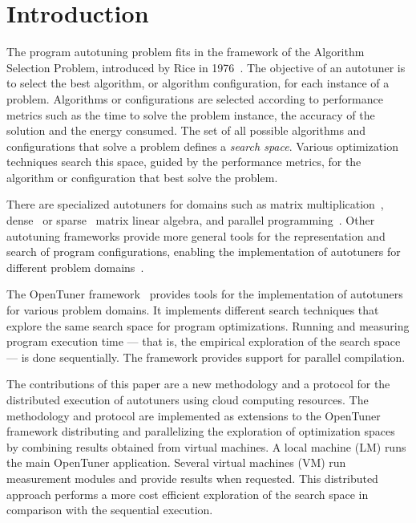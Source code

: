 \section{Introduction} \label{sec:intro}

The program autotuning problem fits in the framework of the Algorithm Selection
Problem, introduced by Rice in 1976~\cite{rice1976algorithm}. The objective of
an autotuner is to select the best algorithm, or algorithm configuration, for
each instance of a problem.  Algorithms or configurations are selected
according to performance metrics such as the time to solve the problem
instance, the accuracy of the solution and the energy consumed.  The set of all
possible algorithms and configurations that solve a problem defines a
\emph{search space}. Various optimization techniques search this space, guided
by the performance metrics, for the algorithm or configuration that best solve
the problem.

There are specialized autotuners for domains such as matrix
multiplication~\cite{bilmes1997phipac}, dense~\cite{whaley1998atlas} or
sparse~\cite{vuduc2005oski} matrix linear algebra, and parallel
programming~\cite{jordan2012multi}. Other autotuning frameworks provide more
general tools for the representation and search of program configurations,
enabling the implementation of autotuners for different problem
domains~\cite{ansel2014opentuner,hutter2009paramils}.

The OpenTuner framework~\cite{ansel2014opentuner} provides tools for the
implementation of autotuners for various problem domains. It implements
different search techniques that explore the same search space for program
optimizations. 
Running and measuring program execution time --- that is, the empirical 
exploration of the search space --- is done sequentially.
The framework provides support for parallel compilation.

The contributions of this paper are a new methodology and a protocol for the
distributed execution of autotuners using cloud computing resources.  The
methodology and protocol are implemented as extensions to the OpenTuner
framework distributing and parallelizing the exploration of optimization spaces
by combining results obtained from virtual machines.  A local machine (LM) runs
the main OpenTuner application. Several virtual machines (VM) run measurement
modules and provide results when requested. This distributed approach performs
a more cost efficient exploration of the search space in comparison with the
sequential execution.

